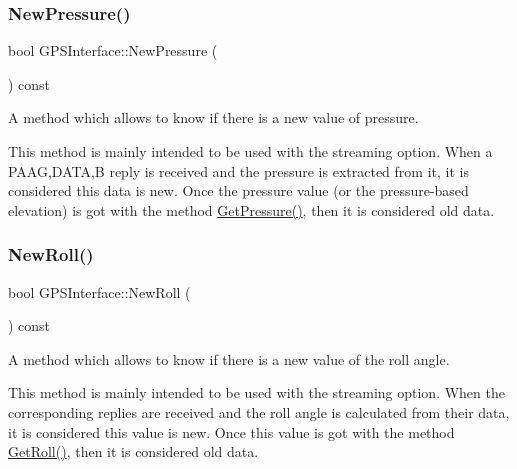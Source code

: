 \subsubsection{\texorpdfstring{New\+Pressure()}{NewPressure()}}
{\footnotesize\ttfamily bool G\+P\+S\+Interface\+::\+New\+Pressure (\begin{DoxyParamCaption}{ }\end{DoxyParamCaption}) const\hspace{0.3cm}{\ttfamily [inline]}}



A method which allows to know if there is a new value of pressure. 

This method is mainly intended to be used with the streaming option. When a P\+A\+AG,D\+A\+TA,B reply is received and the pressure is extracted from it, it is considered this data is new. Once the pressure value (or the pressure-\/based elevation) is got with the method \hyperlink{classGPSInterface_ac0b9cef2de5103ee5ada0154cda9b326}{Get\+Pressure()}, then it is considered old data. \mbox{\label{classGPSInterface_a89f1f28d2effdc31de745b7496e6f09a}} 
\subsubsection{\texorpdfstring{New\+Roll()}{NewRoll()}}
{\footnotesize\ttfamily bool G\+P\+S\+Interface\+::\+New\+Roll (\begin{DoxyParamCaption}{ }\end{DoxyParamCaption}) const\hspace{0.3cm}{\ttfamily [inline]}}



A method which allows to know if there is a new value of the roll angle. 

This method is mainly intended to be used with the streaming option. When the corresponding replies are received and the roll angle is calculated from their data, it is considered this value is new. Once this value is got with the method \hyperlink{classGPSInterface_ae9f9c8e37b88f966ba1f12a52fcd5a16}{Get\+Roll()}, then it is considered old data. \mbox{\label{classGPSInterface_af2656b318d0476d12067861d2477df52}} 
